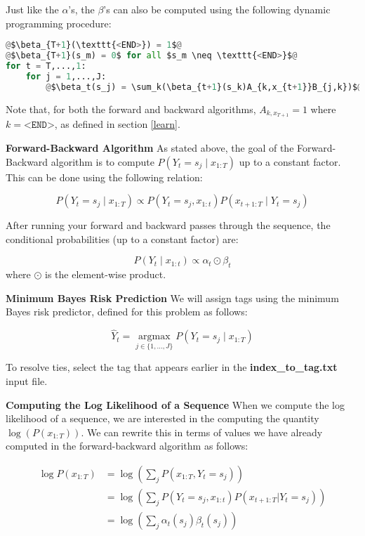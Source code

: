 \documentclass[11pt,addpoints,answers]{exam}
\newcommand \argmax {\operatorname*{argmax}}
\begin{document}
Just like the $\alpha$'s, the $\beta$'s can also be computed using the following dynamic programming procedure:

\begin{lstlisting}[language=Python,escapechar=@]
@$\beta_{T+1}(\texttt{<END>}) = 1$@
@$\beta_{T+1}(s_m) = 0$ for all $s_m \neq \texttt{<END>}$@
for t = T,...,1:
    for j = 1,...,J:
        @$\beta_t(s_j) = \sum_k(\beta_{t+1}(s_k)A_{k,x_{t+1}}B_{j,k})$@
\end{lstlisting}
Note that, for both the forward and backward algorithms, $A_{k, x_{T+1}} = 1$ where $k = \texttt{<END>}$, as defined in section \ref{learn}.

\clearpage
\textbf{Forward-Backward Algorithm}
As stated above, the goal of the Forward-Backward algorithm is to compute $P(Y_t =s_j \mid x_{1:T})$ up to a constant factor. This can be done using the following relation:

$$P(Y_t =s_j \mid x_{1:T}) \propto P(Y_t=s_j, x_{1:t})P(x_{t+1:T} \mid Y_t=s_j) $$

After running your forward and backward passes through the sequence, the conditional probabilities (up to a constant factor) are:

$$P(Y_t \mid x_{1:t}) \propto \alpha_t\odot\beta_t$$
where $\odot$ is the element-wise product.

\vspace{0.4 in}
\textbf{Minimum Bayes Risk Prediction}
We will assign tags using the minimum Bayes risk predictor, defined for this problem as follows:

$$\hat{Y}_t = \argmax_{j\in \{1,\dots,J\}} P(Y_t = s_j \mid x_{1:T})$$

To resolve ties, select the tag that appears earlier in the \textbf{index\_to\_tag.txt} input file.

\textbf{Computing the Log Likelihood of a Sequence}
When we compute the log likelihood of a sequence, we are interested in the computing the quantity $\log(P(x_{1:T}))$. We can rewrite this in terms of values we have already computed in the forward-backward algorithm as follows:

\begin{align*}
    \log{P(x_{1:T})} &= \log{\left(\sum_j P(x_{1:T},Y_t=s_j)\right)}\\
    &= \log{\left(\sum_j P(Y_t = s_j, x_{1:t}) P(x_{t+1:T} | Y_t = s_j) \right)} \\
    &= \log{\left(\sum_j \alpha_t (s_j) \beta_t (s_j)\right)}
\end{align*}
\end{document}
